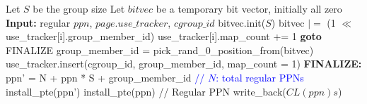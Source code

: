 \documentclass[12pt]{article}
\begin{document}
\begin{algorithm}[H]
\caption{Additional Action during Page Mapping}
\label{alg:page-mapping}
\begin{algorithmic}[1]
\STATE Let $S$ be the group size
\STATE Let $bitvec$ be a temporary bit vector, initially all zero
\STATE \textbf{Input:} regular $ppn$, $page.use\_tracker$, $cgroup\_id$
\STATE bitvec.init($S$)
    \STATE bitvec $|=$ (1 $\ll$ use\_tracker[i].group\_member\_id)
        \STATE use\_tracker[i].map\_count += 1
        \STATE \textbf{goto} FINALIZE
    \ENDIF
\ENDFOR
\STATE group\_member\_id = pick\_rand\_0\_position\_from(bitvec)
\STATE use\_tracker.insert(cgroup\_id, group\_member\_id, map\_count = 1)
\STATE \textbf{FINALIZE:}
    \STATE ppn' = N + ppn * S + group\_member\_id \hfill \textcolor{blue} {// $N$: total regular PPNs}
    \STATE install\_pte(ppn')
\ELSE
    \STATE install\_pte(ppn) \hfill // Regular PPN
    \STATE write\_back($CL(ppn)s$)
\ENDIF
\end{algorithmic}
\end{algorithm}
\end{document}
